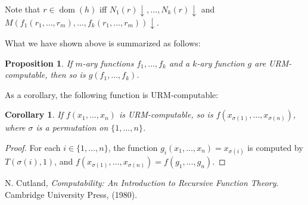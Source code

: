 \documentclass[12pt]{article}
\newtheorem{prop}{Proposition}
\newtheorem{cor}{Corollary}
\begin{document}
Note that $r\in \operatorname{dom}(h)$ iff $N_1(r)\downarrow, \ldots, N_k(r)\downarrow$ and $M(f_1(r_1,\ldots, r_m),\ldots,f_k(r_1,\ldots, r_m))\downarrow$.

What we have shown above is summarized as follows:
\begin{prop} If $m$-ary functions $f_1,\ldots,f_k$ and a $k$-ary function $g$ are URM-computable, then so is $g(f_1,\ldots, f_k)$. \end{prop}

As a corollary, the following function is URM-computable:
\begin{cor} If $f(x_1,\ldots,x_n)$ is URM-computable, so is $f(x_{\sigma(1)},\ldots, x_{\sigma(n)})$, where $\sigma$ is a permutation on $\lbrace 1,\ldots, n\rbrace$. \end{cor}
\begin{proof} For each $i\in \lbrace 1,\ldots, n\rbrace$, the function $g_i(x_1,\ldots, x_n)=x_{\sigma(i)}$ is computed by $T(\sigma(i),1)$, and $f(x_{\sigma(1)},\ldots, x_{\sigma(n)})=f(g_1,\ldots,g_n)$.  \end{proof}

\begin{thebibliography}{9}
 N. Cutland, {\em Computability: An Introduction to Recursive Function Theory}. Cambridge University Press, (1980).
\end{thebibliography}
\end{document}
